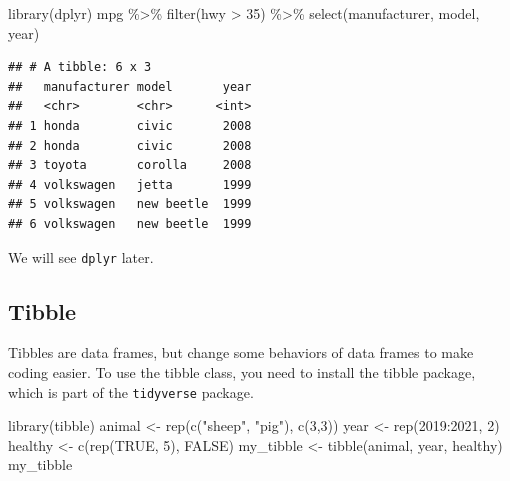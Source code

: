\documentclass[
]{book}
\newenvironment{Shaded}{\begin{snugshade}}{\end{snugshade}}
\newcommand{\ConstantTok}[1]{\textcolor[rgb]{0.00,0.00,0.00}{#1}}
\newcommand{\DecValTok}[1]{\textcolor[rgb]{0.00,0.00,0.81}{#1}}
\newcommand{\FunctionTok}[1]{\textcolor[rgb]{0.00,0.00,0.00}{#1}}
\newcommand{\NormalTok}[1]{#1}
\newcommand{\OtherTok}[1]{\textcolor[rgb]{0.56,0.35,0.01}{#1}}
\newcommand{\SpecialCharTok}[1]{\textcolor[rgb]{0.00,0.00,0.00}{#1}}
\newcommand{\StringTok}[1]{\textcolor[rgb]{0.31,0.60,0.02}{#1}}
\begin{document}
\begin{Shaded}
\begin{Highlighting}[]
\FunctionTok{library}\NormalTok{(dplyr)}
\NormalTok{mpg }\SpecialCharTok{\%\textgreater{}\%} \FunctionTok{filter}\NormalTok{(hwy }\SpecialCharTok{\textgreater{}} \DecValTok{35}\NormalTok{) }\SpecialCharTok{\%\textgreater{}\%} \FunctionTok{select}\NormalTok{(manufacturer, model, year)}
\end{Highlighting}
\end{Shaded}

\begin{verbatim}
## # A tibble: 6 x 3
##   manufacturer model       year
##   <chr>        <chr>      <int>
## 1 honda        civic       2008
## 2 honda        civic       2008
## 3 toyota       corolla     2008
## 4 volkswagen   jetta       1999
## 5 volkswagen   new beetle  1999
## 6 volkswagen   new beetle  1999
\end{verbatim}

We will see \texttt{dplyr} later.

\hypertarget{tibble}{%
\subsection{Tibble}\label{tibble}}

Tibbles are data frames, but change some behaviors of data frames to make coding easier. To use the tibble class, you need to install the tibble package, which is part of the \texttt{tidyverse} package.

\begin{Shaded}
\begin{Highlighting}[]
\FunctionTok{library}\NormalTok{(tibble)}
\NormalTok{animal }\OtherTok{\textless{}{-}} \FunctionTok{rep}\NormalTok{(}\FunctionTok{c}\NormalTok{(}\StringTok{"sheep"}\NormalTok{, }\StringTok{"pig"}\NormalTok{), }\FunctionTok{c}\NormalTok{(}\DecValTok{3}\NormalTok{,}\DecValTok{3}\NormalTok{))}
\NormalTok{year }\OtherTok{\textless{}{-}} \FunctionTok{rep}\NormalTok{(}\DecValTok{2019}\SpecialCharTok{:}\DecValTok{2021}\NormalTok{, }\DecValTok{2}\NormalTok{)}
\NormalTok{healthy }\OtherTok{\textless{}{-}} \FunctionTok{c}\NormalTok{(}\FunctionTok{rep}\NormalTok{(}\ConstantTok{TRUE}\NormalTok{, }\DecValTok{5}\NormalTok{), }\ConstantTok{FALSE}\NormalTok{)}
\NormalTok{my\_tibble }\OtherTok{\textless{}{-}} \FunctionTok{tibble}\NormalTok{(animal, year, healthy)}
\NormalTok{my\_tibble}
\end{Highlighting}
\end{Shaded}
\end{document}

